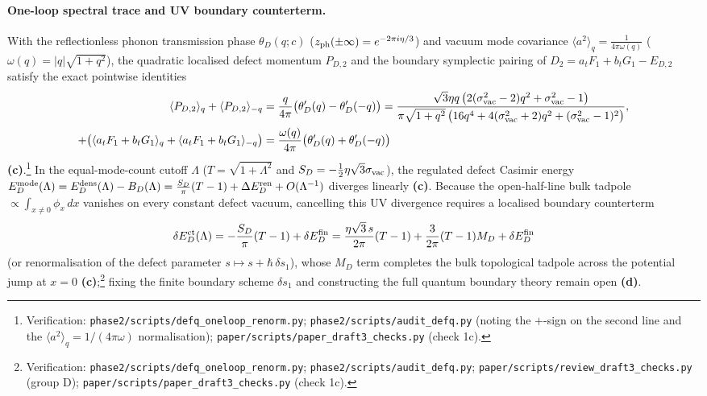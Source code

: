 \documentclass[11pt,a4paper]{article}
\newcommand{\lab}[1]{{\normalfont\sffamily\footnotesize\bfseries(#1)}}
\newcommand{\Lc}{\lab{c}}
\newcommand{\Ld}{\lab{d}}
\newcommand{\scr}[1]{\nolinkurl{#1}}
\newcommand{\chk}[1]{\footnote{\raggedright Verification: #1.}}
\newcommand{\hb}{\hbar}
\theoremstyle{remark}
\begin{document}
\paragraph{One-loop spectral trace and UV boundary counterterm.} With the reflectionless phonon transmission phase $\theta_D(q;c)$ ($z_{\rm ph}(\pm\infty)=e^{-2\pi i\eta/3}$) and vacuum mode covariance $\langle a^2\rangle_q=\tfrac1{4\pi\omega(q)}$ ($\omega(q)=|q|\sqrt{1+q^2}$), the quadratic localised defect momentum $P_{D,2}$ and the boundary symplectic pairing of $D_2=a_tF_1+b_tG_1-E_{D,2}$ satisfy the exact pointwise identities
\begin{equation}\label{eq:PD2trace}
\begin{aligned}
\langle P_{D,2}\rangle_q+\langle P_{D,2}\rangle_{-q}&=\frac{q}{4\pi}\big(\theta_D'(q)-\theta_D'(-q)\big)
=\frac{\sqrt3\eta q\,\big(2(\sigma_{\rm vac}^2-2)q^2+\sigma_{\rm vac}^2-1\big)}{\pi\sqrt{1+q^2}\,\big(16q^4+4(\sigma_{\rm vac}^2+2)q^2+(\sigma_{\rm vac}^2-1)^2\big)},\\
+\big(\langle a_tF_1+b_tG_1\rangle_q+\langle a_tF_1+b_tG_1\rangle_{-q}\big)&=\frac{\omega(q)}{4\pi}\big(\theta_D'(q)+\theta_D'(-q)\big)
\end{aligned}
\end{equation}
\Lc.\chk{\scr{phase2/scripts/defq_oneloop_renorm.py}; \scr{phase2/scripts/audit_defq.py} (noting the $+$-sign on the second line and the $\langle a^2\rangle_q=1/(4\pi\omega)$ normalisation); \scr{paper/scripts/paper_draft3_checks.py} (check 1c)}
In the equal-mode-count cutoff $\Lambda$ ($T=\sqrt{1+\Lambda^2}$ and $S_D=-\tfrac12\eta\sqrt3\sigma_{\rm vac}$), the regulated defect Casimir energy $E_D^{\rm mode}(\Lambda)=E_D^{\rm dens}(\Lambda)-B_D(\Lambda)=\frac{S_D}{\pi}(T-1)+\Delta E_D^{\rm ren}+O(\Lambda^{-1})$ diverges linearly \Lc. Because the open-half-line bulk tadpole $\propto\int_{x\neq0}\phi_x\,dx$ vanishes on every constant defect vacuum, cancelling this UV divergence requires a localised boundary counterterm
\begin{equation}\label{eq:defUVct}
\delta E_D^{\rm ct}(\Lambda)=-\frac{S_D}{\pi}(T-1)+\delta E_D^{\rm fin}
=\frac{\eta\sqrt3\,s}{2\pi}(T-1)+\frac3{2\pi}(T-1)M_D+\delta E_D^{\rm fin}
\end{equation}
(or renormalisation of the defect parameter $s\mapsto s+\hb\,\delta s_1$), whose $M_D$ term completes the bulk topological tadpole across the potential jump at $x=0$ \Lc;\chk{\scr{phase2/scripts/defq_oneloop_renorm.py}; \scr{phase2/scripts/audit_defq.py}; \scr{paper/scripts/review_draft3_checks.py} (group D); \scr{paper/scripts/paper_draft3_checks.py} (check 1c)} fixing the finite boundary scheme $\delta s_1$ and constructing the full quantum boundary theory remain open \Ld.
\end{document}

